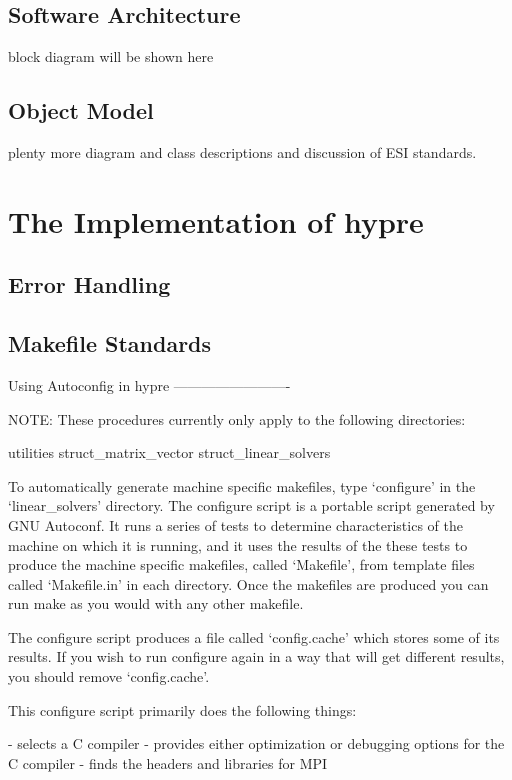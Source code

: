 \subsection{Software Architecture}
block diagram will be shown here

\subsection{Object Model}
plenty more diagram and class descriptions and discussion of ESI standards.

\section{The Implementation of hypre}

\subsection{Error Handling}

\subsection{Makefile Standards}

   		 Using Autoconfig in hypre
   		 -------------------------

NOTE: These procedures currently only apply to the following directories:

  utilities
  struct_matrix_vector
  struct_linear_solvers

To automatically generate machine specific makefiles, type `configure'
in the `linear_solvers' directory.  The configure script is a portable
script generated by GNU Autoconf.  It runs a series of tests to
determine characteristics of the machine on which it is running, and
it uses the results of the these tests to produce the machine specific
makefiles, called `Makefile', from template files called `Makefile.in'
in each directory.  Once the makefiles are produced you can run make
as you would with any other makefile.

The configure script produces a file called `config.cache' which
stores some of its results.  If you wish to run configure again in a
way that will get different results, you should remove `config.cache'.

This configure script primarily does the following things:

  - selects a C compiler
  - provides either optimization or debugging options for the C compiler
  - finds the headers and libraries for MPI

